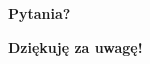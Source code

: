 \documentclass[a4paper, 11pt]{beamer}
\begin{document}
	\section*{}

	\begin{frame}
		\center
		\Huge \bfseries
		Pytania?
	\end{frame}

	\begin{frame}
		\center
		\Huge \bfseries
		Dziękuję za uwagę!
	\end{frame}
\end{document}

